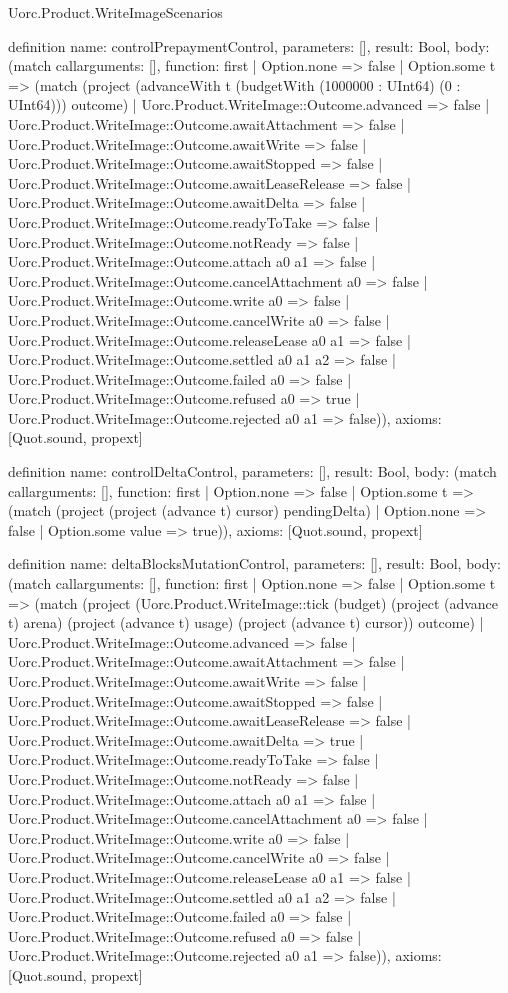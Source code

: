 \begin{lexlean}{Uorc.Product.WriteImageScenarios}
\begin{semanticmodule}
definition{
  name: controlPrepaymentControl,
  parameters: [],
  result: Bool,
  body: (match call{arguments: [], function: first}
    | Option.none => false
    | Option.some t => (match (project (advanceWith t (budgetWith (1000000 : UInt64) (0 : UInt64))) outcome)
      | Uorc.Product.WriteImage::Outcome.advanced => false
      | Uorc.Product.WriteImage::Outcome.awaitAttachment => false
      | Uorc.Product.WriteImage::Outcome.awaitWrite => false
      | Uorc.Product.WriteImage::Outcome.awaitStopped => false
      | Uorc.Product.WriteImage::Outcome.awaitLeaseRelease => false
      | Uorc.Product.WriteImage::Outcome.awaitDelta => false
      | Uorc.Product.WriteImage::Outcome.readyToTake => false
      | Uorc.Product.WriteImage::Outcome.notReady => false
      | Uorc.Product.WriteImage::Outcome.attach a0 a1 => false
      | Uorc.Product.WriteImage::Outcome.cancelAttachment a0 => false
      | Uorc.Product.WriteImage::Outcome.write a0 => false
      | Uorc.Product.WriteImage::Outcome.cancelWrite a0 => false
      | Uorc.Product.WriteImage::Outcome.releaseLease a0 a1 => false
      | Uorc.Product.WriteImage::Outcome.settled a0 a1 a2 => false
      | Uorc.Product.WriteImage::Outcome.failed a0 => false
      | Uorc.Product.WriteImage::Outcome.refused a0 => true
      | Uorc.Product.WriteImage::Outcome.rejected a0 a1 => false)),
  axioms: [Quot.sound, propext]
}

definition{
  name: controlDeltaControl,
  parameters: [],
  result: Bool,
  body: (match call{arguments: [], function: first}
    | Option.none => false
    | Option.some t => (match (project (project (advance t) cursor) pendingDelta)
      | Option.none => false
      | Option.some value => true)),
  axioms: [Quot.sound, propext]
}

definition{
  name: deltaBlocksMutationControl,
  parameters: [],
  result: Bool,
  body: (match call{arguments: [], function: first}
    | Option.none => false
    | Option.some t => (match (project (Uorc.Product.WriteImage::tick (budget) (project (advance t) arena) (project (advance t) usage) (project (advance t) cursor)) outcome)
      | Uorc.Product.WriteImage::Outcome.advanced => false
      | Uorc.Product.WriteImage::Outcome.awaitAttachment => false
      | Uorc.Product.WriteImage::Outcome.awaitWrite => false
      | Uorc.Product.WriteImage::Outcome.awaitStopped => false
      | Uorc.Product.WriteImage::Outcome.awaitLeaseRelease => false
      | Uorc.Product.WriteImage::Outcome.awaitDelta => true
      | Uorc.Product.WriteImage::Outcome.readyToTake => false
      | Uorc.Product.WriteImage::Outcome.notReady => false
      | Uorc.Product.WriteImage::Outcome.attach a0 a1 => false
      | Uorc.Product.WriteImage::Outcome.cancelAttachment a0 => false
      | Uorc.Product.WriteImage::Outcome.write a0 => false
      | Uorc.Product.WriteImage::Outcome.cancelWrite a0 => false
      | Uorc.Product.WriteImage::Outcome.releaseLease a0 a1 => false
      | Uorc.Product.WriteImage::Outcome.settled a0 a1 a2 => false
      | Uorc.Product.WriteImage::Outcome.failed a0 => false
      | Uorc.Product.WriteImage::Outcome.refused a0 => false
      | Uorc.Product.WriteImage::Outcome.rejected a0 a1 => false)),
  axioms: [Quot.sound, propext]
}


\end{semanticmodule}
\end{lexlean}
